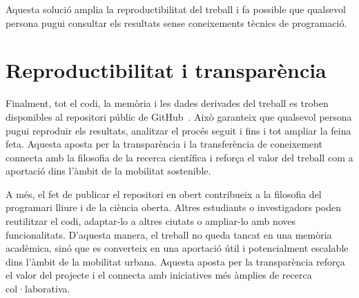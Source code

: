 Aquesta solució amplia la reproductibilitat del treball i fa possible que qualsevol persona
pugui consultar els resultats sense coneixements tècnics de programació.

\section{Reproductibilitat i transparència}
Finalment, tot el codi, la memòria i les dades derivades del treball es troben disponibles al repositori públic de GitHub~\cite{TR-MP-2025}. Això garanteix que qualsevol persona pugui reproduir els resultats, analitzar el procés seguit i fins i tot ampliar la feina feta. Aquesta aposta per la transparència i la transferència de coneixement connecta amb la filosofia de la recerca científica i reforça el valor del treball com a aportació dins l’àmbit de la mobilitat sostenible.

A més, el fet de publicar el repositori en obert contribueix a la filosofia del programari lliure i de la ciència oberta.
Altres estudiants o investigadors poden reutilitzar el codi, adaptar-lo a altres ciutats o ampliar-lo amb noves funcionalitats.
D’aquesta manera, el treball no queda tancat en una memòria acadèmica, sinó que es converteix en una aportació útil i potencialment escalable dins l’àmbit de la mobilitat urbana.
Aquesta aposta per la transparència reforça el valor del projecte i el connecta amb iniciatives més àmplies de recerca col·laborativa.
